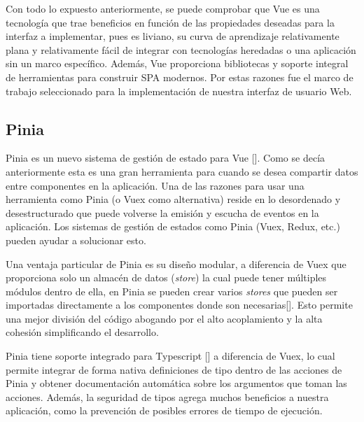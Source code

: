 Con todo lo expuesto anteriormente, se puede comprobar que Vue es una tecnología que trae beneficios en función de las propiedades deseadas para la interfaz a implementar, pues es liviano, su curva de aprendizaje relativamente plana y relativamente fácil de integrar con tecnologías heredadas o una aplicación sin un marco específico. Además, Vue proporciona bibliotecas y soporte integral de herramientas para construir SPA modernos. Por estas razones fue el marco de trabajo seleccionado para la implementación de nuestra interfaz de usuario Web.

\subsection{Pinia}


Pinia es un nuevo sistema de gestión de estado para Vue [\cite{57}]. Como se decía anteriormente esta es una gran herramienta para cuando se desea compartir datos entre componentes en la aplicación. Una de las razones para usar una herramienta como Pinia (o Vuex como alternativa) reside en lo desordenado y desestructurado que puede volverse la emisión y escucha de eventos en la aplicación. Los sistemas de gestión de estados como Pinia (Vuex, Redux, etc.) pueden ayudar a solucionar esto.

Una ventaja particular de Pinia es su diseño modular, a diferencia de Vuex que proporciona solo un almacén de datos (\textit{store}) la cual puede tener múltiples módulos dentro de ella, en Pinia se pueden crear varios \textit{stores} que pueden ser importadas directamente a los componentes donde son necesarias[\cite{57}]. Esto permite una mejor división del código abogando por el alto acoplamiento y la alta cohesión simplificando el desarrollo.

Pinia tiene soporte integrado para Typescript [\cite{57}] a diferencia de Vuex, lo cual permite integrar de forma nativa definiciones de tipo dentro de las acciones de Pinia y obtener documentación automática sobre los argumentos que toman las acciones. Además, la seguridad de tipos agrega muchos beneficios a nuestra aplicación, como la prevención de posibles errores de tiempo de ejecución.

